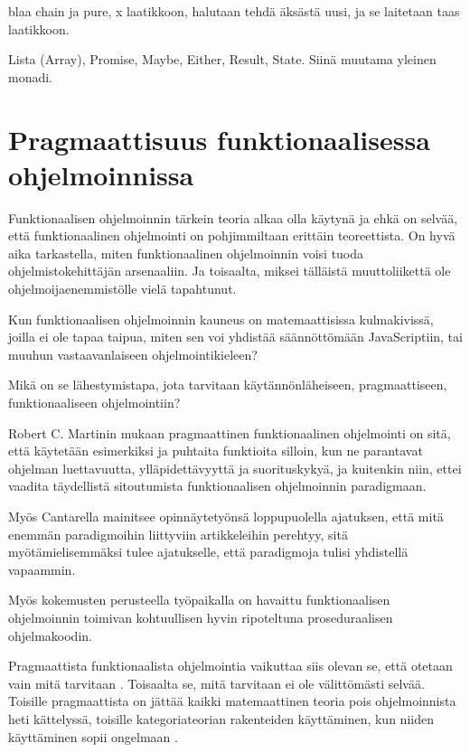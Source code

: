 blaa chain ja pure, x laatikkoon, halutaan tehdä äksästä uusi, ja se laitetaan taas laatikkoon.

Lista (Array), Promise, Maybe, Either, Result, State. Siinä muutama yleinen monadi.

\section{Pragmaattisuus funktionaalisessa ohjelmoinnissa}

Funktionaalisen ohjelmoinnin tärkein teoria alkaa olla käytynä ja ehkä on selvää, että funktionaalinen ohjelmointi on pohjimmiltaan erittäin teoreettista. On hyvä aika tarkastella,  miten funktionaalinen ohjelmoinnin voisi tuoda ohjelmistokehittäjän arsenaaliin. Ja toisaalta, miksei tälläistä muuttoliikettä ole ohjelmoijaenemmistölle vielä tapahtunut.

Kun funktionaalisen ohjelmoinnin kauneus on matemaattisissa kulmakivissä, joilla ei ole tapaa taipua, miten sen voi yhdistää säännöttömään JavaScriptiin, tai muuhun vastaavanlaiseen ohjelmointikieleen?

Mikä on se lähestymistapa, jota tarvitaan käytännönläheiseen, pragmaattiseen, funktionaaliseen ohjelmointiin?

Robert C. Martinin mukaan pragmaattinen funktionaalinen ohjelmointi on sitä, että käytetään esimerkiksi  ja puhtaita funktioita silloin, kun ne parantavat ohjelman luettavuutta, ylläpidettävyyttä ja suorituskykyä, ja kuitenkin niin, ettei vaadita täydellistä sitoutumista funktionaalisen ohjelmoinnin paradigmaan. \citep{martin2017pragmaticfp}

Myös Cantarella mainitsee opinnäytetyönsä loppupuolella ajatuksen, että mitä enemmän paradigmoihin liittyviin artikkeleihin perehtyy, sitä myötämielisemmäksi tulee ajatukselle, että paradigmoja tulisi yhdistellä vapaammin. \citep[45]{cantarella_fp_haitat}

Myös kokemusten perusteella työpaikalla on havaittu funktionaalisen ohjelmoinnin toimivan kohtuullisen hyvin ripoteltuna proseduraalisen ohjelmakoodin.

Pragmaattista funktionaalista ohjelmointia vaikuttaa siis olevan se, että otetaan vain mitä tarvitaan \cite{dear_functional_bros,martin2017pragmaticfp,cantarella_fp_haitat}. Toisaalta se, mitä tarvitaan ei ole välittömästi selvää. Toisille pragmaattista on jättää kaikki matemaattinen teoria pois ohjelmoinnista heti kättelyssä, toisille kategoriateorian rakenteiden käyttäminen, kun niiden käyttäminen sopii ongelmaan \cite{holvikari2021category,martin2017pragmaticfp}.

